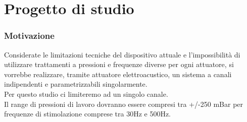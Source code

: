 \section{Progetto di studio}
\begin{frame}[fragile]
\frametitle{Motivazione}
Considerate le limitazioni tecniche del dispositivo attuale e l'impossibilità  di utilizzare trattamenti a pressioni e frequenze diverse per ogni attuatore, si vorrebbe realizzare, tramite attuatore elettroacustico, un sistema a canali indipendenti e parametrizzabili singolarmente.\\ Per questo studio ci limiteremo ad un singolo canale.\\
Il range di pressioni di lavoro dovranno essere compresi tra +/-250 mBar per frequenze di stimolazione comprese tra 30Hz e 500Hz.
\end{frame}


